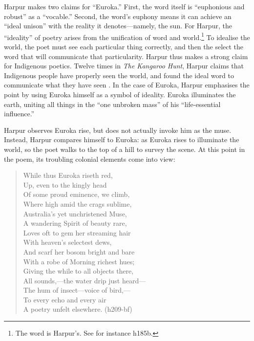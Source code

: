 \documentclass[
  Crown,
  times,
  sageh]{sagej}
\begin{document}
Harpur makes two claims for ``Euroka.'' First, the word itself is
``euphonious and robust'' as a ``vocable.'' Second, the word's euphony
means it can achieve an ``ideal unison'' with the reality it
denotes---namely, the sun. For Harpur, the ``ideality'' of poetry arises
from the unification of word and world.\footnote{The word is Harpur's.
  See for instance h185b.} To idealise the world, the poet must see each
particular thing correctly, and then the select the word that will
communicate that particularity. Harpur thus makes a strong claim for
Indigenous poetics. Twelve times in \emph{The Kangaroo Hunt}, Harpur
claims that Indigenous people have properly seen the world, and found
the ideal word to communicate what they have seen
\citep[5]{webby_representations_2013}. In the case of Euroka, Harpur
emphasises the point by using Euroka himself as a symbol of ideality.
Euroka illuminates the earth, uniting all things in the ``one unbroken
mass'' of his ``life-essential influence.''

Harpur observes Euroka rise, but does not actually invoke him as the
muse. Instead, Harpur compares himself to Euroka: as Euroka rises to
illuminate the world, so the poet walks to the top of a hill to survey
the scene. At this point in the poem, its troubling colonial elements
come into view:

\begin{quote}
While thus Euroka riseth red,\\
Up, even to the kingly head\\
Of some proud eminence, we climb,\\
Where high amid the crags sublime,\\
Australia's yet unchristened Muse,\\
A wandering Spirit of beauty rare,\\
Loves oft to gem her streaming hair\\
With heaven's selectest dews,\\
And scarf her bosom bright and bare\\
With a robe of Morning richest hues;\\
Giving the while to all objects there,\\
All sounds,---the water drip just heard---\\
The hum of insect---voice of bird,---\\
To every echo and every air\\
A poetry unfelt elsewhere. (h209-bf)
\end{quote}
\end{document}

